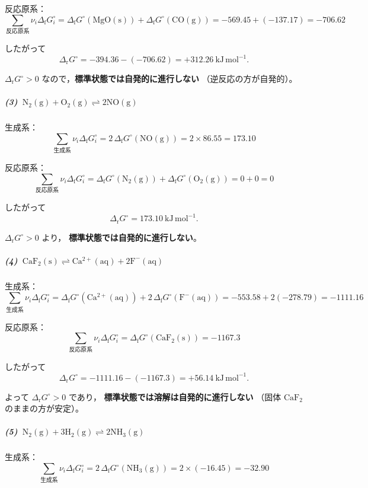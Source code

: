 \documentclass[a4paper,12pt]{jlreq}
\begin{document}
反応原系：
\[
\sum_{\text{反応原系}} \nu_i \Delta_{\mathrm f}G_i^\circ
= \Delta_{\mathrm f}G^\circ(\mathrm{MgO(s)}) + \Delta_{\mathrm f}G^\circ(\mathrm{CO(g)})
= -569.45 + (-137.17)
= -706.62
\]

したがって
\[
\Delta_{\mathrm r}G^\circ
= -394.36 - (-706.62)
= +312.26\ \mathrm{kJ\,mol^{-1}}.
\]

$\Delta_{\mathrm r}G^\circ>0$ なので，\textbf{標準状態では自発的に進行しない}
（逆反応の方が自発的）。

\subparagraph{(3)\ $\mathrm{N_2(g)+O_2(g)\rightleftharpoons 2NO(g)}$}

生成系：
\[
\sum_{\text{生成系}} \nu_i \Delta_{\mathrm f}G_i^\circ
= 2\,\Delta_{\mathrm f}G^\circ(\mathrm{NO(g)})
= 2\times 86.55
= 173.10
\]

反応原系：
\[
\sum_{\text{反応原系}} \nu_i \Delta_{\mathrm f}G_i^\circ
= \Delta_{\mathrm f}G^\circ(\mathrm{N_2(g)})
 + \Delta_{\mathrm f}G^\circ(\mathrm{O_2(g)})
= 0+0=0
\]

したがって
\[
\Delta_{\mathrm r}G^\circ = 173.10\ \mathrm{kJ\,mol^{-1}}.
\]

$\Delta_{\mathrm r}G^\circ>0$ より，
\textbf{標準状態では自発的に進行しない}。

\subparagraph{(4)\ $\mathrm{CaF_2(s)\rightleftharpoons Ca^{2+}(aq)+2F^-(aq)}$}

生成系：
\[
\sum_{\text{生成系}} \nu_i \Delta_{\mathrm f}G_i^\circ
= \Delta_{\mathrm f}G^\circ(\mathrm{Ca^{2+}(aq)})
  + 2\,\Delta_{\mathrm f}G^\circ(\mathrm{F^-(aq)})
= -553.58 + 2(-278.79)
= -1111.16
\]

反応原系：
\[
\sum_{\text{反応原系}} \nu_i \Delta_{\mathrm f}G_i^\circ
= \Delta_{\mathrm f}G^\circ(\mathrm{CaF_2(s)})
= -1167.3
\]

したがって
\[
\Delta_{\mathrm r}G^\circ
= -1111.16 - (-1167.3)
= +56.14\ \mathrm{kJ\,mol^{-1}}.
\]

よって $\Delta_{\mathrm r}G^\circ>0$ であり，
\textbf{標準状態では溶解は自発的に進行しない}
（固体 $\mathrm{CaF_2}$ のままの方が安定）。

\subparagraph{(5)\ $\mathrm{N_2(g)+3H_2(g)\rightleftharpoons 2NH_3(g)}$}

生成系：
\[
\sum_{\text{生成系}} \nu_i \Delta_{\mathrm f}G_i^\circ
= 2\,\Delta_{\mathrm f}G^\circ(\mathrm{NH_3(g)})
= 2\times(-16.45)
= -32.90
\]
\end{document}
